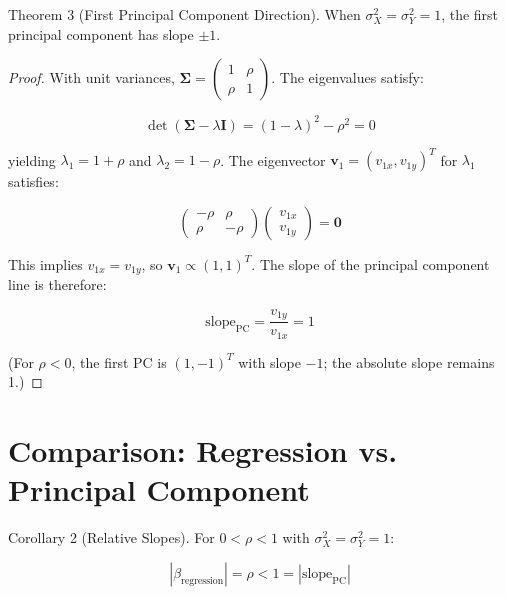 \documentclass{article}
\begin{document}
Theorem 3 (First Principal Component Direction). When $\sigma_X^2 = \sigma_Y^2 = 1$, the first principal component has slope $\pm 1$.

\begin{proof}
With unit variances, $\mathbf{\Sigma} = \begin{pmatrix} 1 & \rho \\ \rho & 1 \end{pmatrix}$. The eigenvalues satisfy:

\begin{equation}
    \det(\mathbf{\Sigma} - \lambda\mathbf{I}) = (1 - \lambda)^2 - \rho^2 = 0
\end{equation}

yielding $\lambda_1 = 1 + \rho$ and $\lambda_2 = 1 - \rho$. The eigenvector $\mathbf{v}_1 = (v_{1x}, v_{1y})^T$ for $\lambda_1$ satisfies:

\begin{equation}
    \begin{pmatrix} -\rho & \rho \\ \rho & -\rho \end{pmatrix} \begin{pmatrix} v_{1x} \\ v_{1y} \end{pmatrix} = \mathbf{0}
\end{equation}

This implies $v_{1x} = v_{1y}$, so $\mathbf{v}_1 \propto (1,1)^T$. The slope of the principal component line is therefore:

\begin{equation}
    \text{slope}_{\text{PC}} = \frac{v_{1y}}{v_{1x}} = 1
\end{equation}

(For $\rho < 0$, the first PC is $(1,-1)^T$ with slope $-1$; the absolute slope remains 1.)
\end{proof}

\section*{Comparison: Regression vs. Principal Component}

Corollary 2 (Relative Slopes). For $0 < \rho < 1$ with $\sigma_X^2 = \sigma_Y^2 = 1$:

\begin{equation}
    \boxed{|\beta_{\text{regression}}| = \rho < 1 = |\text{slope}_{\text{PC}}|}
\end{equation}
\end{document}
